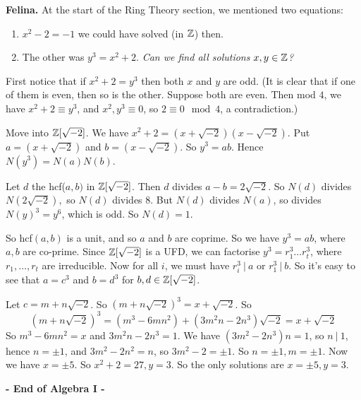 \documentclass[10pt]{scrartcl}
\begin{document}
\textbf{Felina.} At the start of the Ring Theory section, we mentioned two equations:\begin{enumerate}

\item $x^2 -2 = -1$ we could have solved (in $\mathbb{Z}$) then.
 
\item  The other was $y^3 = x^2 + 2$. \textit{ Can we find all solutions $x,y \in \mathbb{Z}$?}
  \end{enumerate}\vspace*{5pt}
  
  First notice that if $x^2 +2 = y^3$ then both $x$ and $y$ are odd. (It is clear that if one of them is even, then so is the other. Suppose both are even. Then mod $4$, we have $x^2 + 2 \equiv y^3$, and $x^2,y^3 \equiv 0$, so $2 \equiv 0 \mod 4$, a contradiction.)
  
 Move into $\mathbb{Z}[\sqrt{-2}]$. We have $x^2 +2 = (x + \sqrt{-2})(x-\sqrt{-2})$. Put $a = (x+\sqrt{-2})$ and $b = (x-\sqrt{-2}).$ So $y^3 = ab$. Hence $N(y^3) = N(a)N(b).$
 
  Let $d$ the hcf($a,b)$ in $\mathbb{Z}[\sqrt{-2}]$. Then $d$ divides $a-b = 2\sqrt{-2}$. So $N(d)$ divides $N(2\sqrt{-2}),$ so $N(d) $ divides $8$. But $N(d)$ divides $N(a)$, so divides $N(y)^3 = y^6$, which is odd. So $N(d) = 1$.
 
  So hcf$(a,b)$ is a unit, and so $a$ and $b$ are coprime. So we have $y^3 = ab$, where $a,b$ are co-prime. Since $\mathbb{Z}[\sqrt{-2}]$ is a UFD, we can factorise $y^3 = r_1^3 \dots r_t^3$, where $r_1,\dots,r_t$ are irreducible. Now for all $i$, we must have $r_i^3 ~|~ a$ or $r_1^3 ~|~ b$. So it's easy to see that $a=c^3$ and $b = d^3$ for $b,d \in \mathbb{Z}[\sqrt{-2}]$. 
  
  Let $c = m+n\sqrt{-2}$. So $(m + n\sqrt{-2})^3 = x + \sqrt{-2}$. So
  \[(m + n\sqrt{-2})^3  = (m^3 -6mn^2) + (3m^2n-2n^3)\sqrt{-2} = x+\sqrt{-2}\]
  So $m^3 - 6mn^2 = x$ and $3m^2n - 2n^3 = 1$. We have $(3m^2 - 2n^3)n = 1$, so $n~|~1$, hence $n = \pm 1$, and $3m^2 - 2n^2 = n$, so $3m^2 - 2 =\pm 1$. So $n = \pm 1, m = \pm 1$. Now we have $x = \pm 5$. So $x^2 + 2 = 27, y = 3$. So the only solutions are $x = \pm 5, y = 3$.\\
  
  \begin{center}
  \textsf{\textbf{- End of Algebra I -}}	
  \end{center}


 
\end{document}
